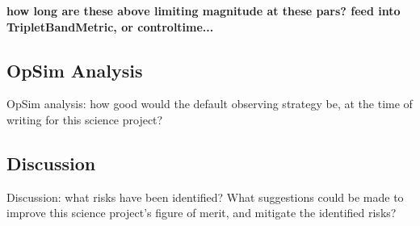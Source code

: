 \textbf{how long are these above limiting magnitude at these pars? feed into TripletBandMetric, or controltime...}


\subsection{OpSim Analysis}
\label{sec:keyword:analysis}

OpSim analysis: how good would the default observing strategy be, at
the time of writing for this science project?



\subsection{Discussion}
\label{sec:keyword:discussion}

Discussion: what risks have been identified? What suggestions could be
made to improve this science project's figure of merit, and mitigate
the identified risks?



\navigationbar
